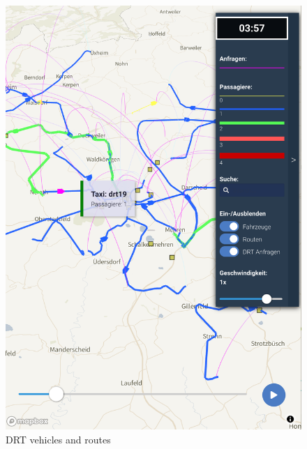 \begin{figure}[ht]
\centering
\begin{minipage}[c]{0.45\textwidth}
   \includegraphics[width=\linewidth]{chapters/22-avov/images/fig-drt-vehicles.png}
   \caption{DRT vehicles and routes}
   \label{fig:avov-drt-vehicles-routes}
\end{minipage}
\begin{minipage}[c]{0.45\textwidth}

\end{minipage}
\end{figure}
